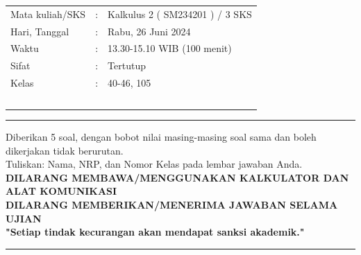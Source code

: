 \documentclass[10pt,openany,a4paper]{article}
\theoremstyle{definition}
\theoremstyle{definition}
\theoremstyle{plain}
\begin{document}
    \begin{center}
	\begin{tabular}{lcl}
		Mata kuliah/SKS & : & Kalkulus 2 ( SM234201 ) / 3 SKS\\
		Hari, Tanggal & : & Rabu, 26 Juni 2024\\
		Waktu & : & 13.30-15.10 WIB (100 menit)\\
		Sifat & : & Tertutup\\
		Kelas & : & 40-46, 105\\
  ~
	\end{tabular}

    \noindent\rule{\textwidth}{2.pt}
    \noindent Diberikan 5 soal, dengan bobot nilai masing-masing soal sama dan boleh dikerjakan tidak berurutan.\\
    Tuliskan: Nama, NRP, dan Nomor Kelas pada lembar jawaban Anda.\\
    \textbf{\MakeUppercase{dilarang membawa/menggunakan kalkulator dan alat komunikasi}}\\
    {\textbf{\MakeUppercase{dilarang memberikan/menerima jawaban selama ujian}}}\\
    {\textbf{"Setiap tindak kecurangan akan mendapat sanksi akademik."}}

	
    \noindent\rule{\textwidth}{2.pt}
        \end{center}
\end{document}
